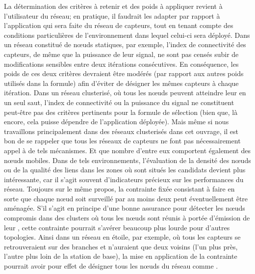 La détermination des critères à retenir et des poids à appliquer revient à l'utilisateur du réseau; en pratique, il faudrait les adapter par rapport à l'application qui sera faite du réseau de capteurs, tout en tenant compte des conditions particulières de l'environnement dans lequel celui-ci sera déployé.
Dans un réseau constitué de nœuds statiques, par exemple, l'index de connectivité des capteurs, de même que la puissance de leur signal, ne sont pas censés subir de modifications sensibles entre deux itérations consécutives.
En conséquence, les poids de ces deux critères devraient être modérés (par rapport aux autres poids utilisés dans la formule) afin d'éviter de désigner les mêmes capteurs à chaque itération.
Dans un réseau clusterisé, où tous les nœuds peuvent atteindre leur \CH en un seul saut, l'index de connectivité ou la puissance du signal ne constituent peut-être pas des critères pertinents pour la formule de sélection (bien que, là encore, cela puisse dépendre de l'application déployée).
Mais même si nous travaillons principalement dans des réseaux clusterisés dans cet ouvrage, il est bon de se rappeler que tous les réseaux de capteurs ne font pas nécessairement appel à de tels mécanismes.
Et que nombre d'entre eux comportent également des nœuds mobiles.
Dans de tels environnements, l'évaluation de la densité des nœuds ou de la qualité des liens dans les zones où sont situés les \cns candidats devient plus intéressante, car il s'agit souvent d'indicateurs précieux sur les performances du réseau.
Toujours sur le même propos, la contrainte fixée consistant à faire en sorte que chaque nœud soit surveillé par au moins deux \cns peut éventuellement être aménagée.
S'il s'agit en principe d'une bonne assurance pour détecter les nœuds compromis dans des clusters où tous les nœuds sont réunis à portée d'émission de leur \ch, cette contrainte pourrait s'avérer beaucoup plus lourde pour d'autres topologies.
Ainsi dans un réseau en étoile, par exemple, où tous les capteurs se retrouveraient sur des branches et n'auraient que deux voisins (l'un plus près, l'autre plus loin de la station de base), la mise en application de la contrainte pourrait avoir pour effet de désigner tous les nœuds du réseau comme \cns.
